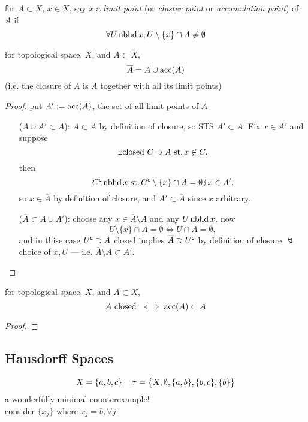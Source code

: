 \begin{defn}
  for $A\subset X$, $x\in X$, say $x$ a \emph{limit point}
  (or \emph{cluster point} or \emph{accumulation point})
  of $A$ if
  \[ \forall U\operatorname{nbhd} x, U\setminus\{x\}\cap A\neq\emptyset \]
\end{defn}

\begin{thm}\label{thm:17.6}
  for topological space, $X$, and $A\subset X$,
  \[ \overline A = A\cup\operatorname{acc}(A) \]
  (i.e. the closure of $A$ is $A$ together with all its limit points)
\end{thm}
\begin{proof}
  put $A':=\operatorname{acc}(A)$, the set of all limit points of $A$
  \begin{itemize}
  \item[($A\cup A'\subset\overline A$):]
    $A\subset\overline A$ by definition of closure,
    so STS $A'\subset A$.
    Fix $x\in A'$ and suppose
    \[ \exists\text{closed } C\supset A\operatorname{\,st.} x\not\in C. \]
    then
    \[
    {C}^{\mathsf{c}}\operatorname{nbhd} x\operatorname{\,st.}
    {C}^{\mathsf{c}}\setminus\{x\} \cap A = \emptyset
    \lightning x\in A',
    \]
    so $x\in\overline{A}$ by definition of closure,
    and $A'\subset\overline{A}$ since $x$ arbitrary.
  \item[($\overline{A}\subset A\cup A'$):]
    choose any $x\in\overline{A}\setminus A$ and any $U\operatorname{nbhd} x$.
    now
    \[ U\setminus\{x\}\cap A=\emptyset \iff U\cap A=\emptyset, \]
    and in thise case ${U}^{\mathsf{c}}\supset A$ closed implies
    $\overline{A}\supset{U}^{\mathsf{c}}$ by definition of closure
    $\lightning$ choice of $x, U$ ---
    i.e. $\overline{A}\setminus A\subset A'$.
  \end{itemize}
\end{proof}

\begin{cor}\label{cor:17.7}
  for topological space, $X$, and $A\subset X$,
  \[ A \text{ closed }\iff \operatorname{acc}(A)\subset A \]
\end{cor}
\begin{proof}
  \sketch{$\cdots$}
\end{proof}

\subsection{Hausdorff Spaces}

\[
X=\{a, b, c\} \quad
\operatorname{\tau} = \big\{X, \emptyset, \{a, b\}, \{b, c\}, \{b\}\big\}
\]
a wonderfully minimal counterexample!\\
consider $\{x_j\}$ where $x_j= b,\forall j$.

